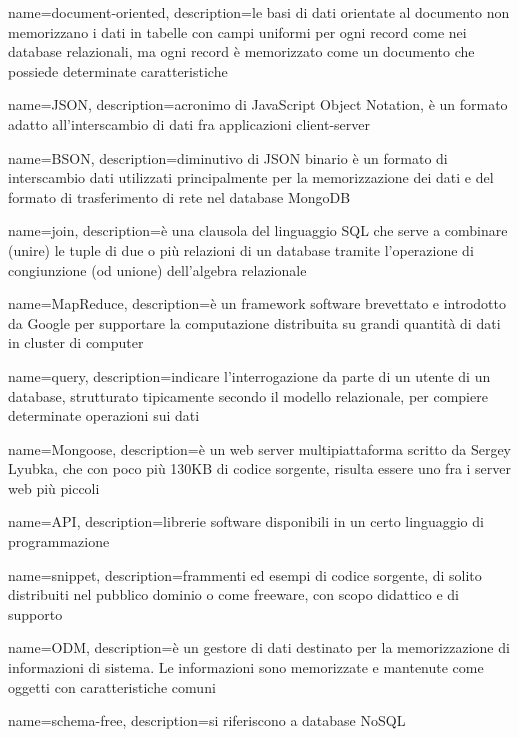  {
	name=document-oriented,
	description={le basi di dati orientate al documento non memorizzano i dati in tabelle con campi uniformi per ogni record come nei database relazionali, ma ogni record è memorizzato come un documento che possiede determinate caratteristiche}
}

 {
	name=JSON,
	description={acronimo di JavaScript Object Notation, è un formato adatto all'interscambio di dati fra applicazioni client-server}
}

 {
	name=BSON,
	description={diminutivo di JSON binario è un formato di interscambio dati utilizzati principalmente per la memorizzazione dei dati e del formato di trasferimento di rete nel database MongoDB}
}

 {
	name=join,
	description={è una clausola del linguaggio SQL che serve a combinare (unire) le tuple di due o più relazioni di un database tramite l'operazione di congiunzione (od unione) dell'algebra relazionale}
}

 {
	name=MapReduce,
	description={è un framework software brevettato e introdotto da Google per supportare la computazione distribuita su grandi quantità di dati in cluster di computer}
}

 {
	name=query,
	description={indicare l'interrogazione da parte di un utente di un database, strutturato tipicamente secondo il modello relazionale, per compiere determinate operazioni sui dati}
}

 {
	name=Mongoose,
	description={è un web server multipiattaforma scritto da Sergey Lyubka, che con poco più 130KB di codice sorgente, risulta essere uno fra i server web più piccoli}
}

 {
	name=API,
	description={librerie software disponibili in un certo linguaggio di programmazione}
}

 {
	name=snippet,
	description={frammenti ed esempi di codice sorgente, di solito distribuiti nel pubblico dominio o come freeware, con scopo didattico e di supporto}
}

 {
	name=ODM,
	description={è un gestore di dati destinato per la memorizzazione di informazioni di sistema. Le informazioni sono memorizzate e mantenute come oggetti con caratteristiche comuni}
}

 {
	name=schema-free,
	description={si riferiscono a database NoSQL}
}

